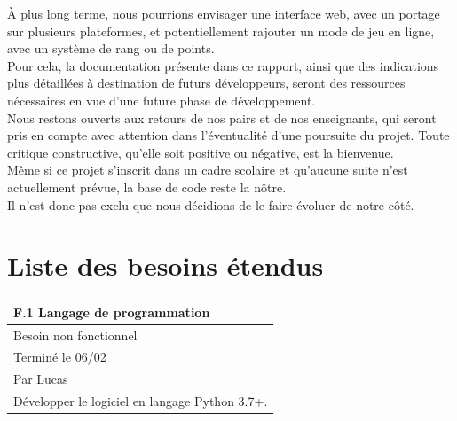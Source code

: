 \documentclass[a4paper,12pt]{article}
\begin{document}
À plus long terme, nous pourrions envisager une interface web, avec un portage sur plusieurs plateformes, et potentiellement rajouter un mode de jeu en ligne, avec un système de rang ou de points.\\
Pour cela, la documentation présente dans ce rapport, ainsi que des indications plus détaillées à destination de futurs développeurs, seront des ressources nécessaires en vue d’une future phase de développement.\\

Nous restons ouverts aux retours de nos pairs et de nos enseignants, qui seront
pris en compte avec attention dans l’éventualité d’une poursuite du projet.
Toute critique constructive, qu’elle soit positive ou négative, est la
bienvenue.\\

Même si ce projet s’inscrit dans un cadre scolaire et qu’aucune suite n’est
actuellement prévue, la base de code reste la nôtre.\\ Il n’est donc pas exclu
que nous décidions de le faire évoluer de notre côté.\\

\newpage

\appendix
\section{Liste des besoins étendus}

\vspace{1cm}

\noindent
\setlength{\arrayrulewidth}{1.5pt}
\renewcommand{\arraystretch}{1.5}
\begin{tabularx}{\textwidth}{|X|}
    \hline
    \textbf{F.1 Langage de programmation}          \\
    \hline
    Besoin non fonctionnel                         \\
    \hline
    Terminé le 06/02                               \\
    Par Lucas                                      \\
    \hline
    Développer le logiciel en langage Python 3.7+. \\
    \hline
\end{tabularx}

\vspace{1cm}
\end{document}
